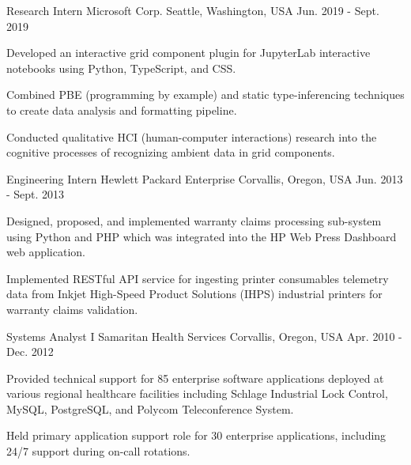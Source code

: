 \begin{cventries}
  \cventry
    {Research Intern} %
    {Microsoft Corp.} %
    {Seattle, Washington, USA} %
    {Jun. 2019 - Sept. 2019} %
    {
      \begin{cvitems} %
        \item {Developed an interactive grid component plugin for JupyterLab interactive notebooks using Python, TypeScript, and CSS.}
        \item {Combined PBE (programming by example) and static type-inferencing techniques to create data analysis and formatting pipeline.}
        \item {Conducted qualitative HCI (human-computer interactions) research into the cognitive processes of recognizing ambient data in grid components.}
      \end{cvitems}
    }

  \cventry
    {Engineering Intern} %
    {Hewlett Packard Enterprise} %
    {Corvallis, Oregon, USA} %
    {Jun. 2013 - Sept. 2013} %
    {
      \begin{cvitems} %
        \item {Designed, proposed, and implemented warranty claims processing sub-system using Python and PHP which was integrated into the HP Web Press Dashboard web application.}
        \item {Implemented RESTful API service for ingesting printer consumables telemetry data from Inkjet High-Speed Product Solutions (IHPS) industrial printers for warranty claims validation.}
      \end{cvitems}
    }

  \cventry
    {Systems Analyst I} %
    {Samaritan Health Services} %
    {Corvallis, Oregon, USA} %
    {Apr. 2010 - Dec. 2012} %
    {
      \begin{cvitems} %
        \item {Provided technical support for 85 enterprise software applications deployed at various regional healthcare facilities including Schlage Industrial Lock Control, MySQL, PostgreSQL, and Polycom Teleconference System.}
        \item {Held primary application support role for 30 enterprise applications, including 24/7 support during on-call rotations.}
      \end{cvitems}
    }


\end{cventries}
